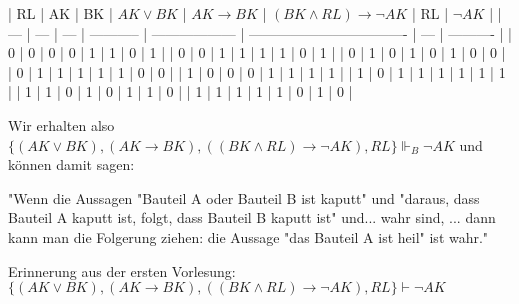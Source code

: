 \documentclass[a4paper]{article}
\begin{document}
\begin{multicols}{3}
  | RL  | AK  | BK  | $AK\vee BK$ | $AK\rightarrow BK$ | $(BK\wedge RL)\rightarrow\lnot AK$ | RL  | $\lnot AK$ |
  | --- | --- | --- | ----------- | ------------------ | ---------------------------------- | --- | ---------- |
  | 0   | 0   | 0   | 0           | 1                  | 1                                  | 0   | 1          |
  | 0   | 0   | 1   | 1           | 1                  | 1                                  | 0   | 1          |
  | 0   | 1   | 0   | 1           | 0                  | 1                                  | 0   | 0          |
  | 0   | 1   | 1   | 1           | 1                  | 1                                  | 0   | 0          |
  | 1   | 0   | 0   | 0           | 1                  | 1                                  | 1   | 1          |
  | 1   | 0   | 1   | 1           | 1                  | 1                                  | 1   | 1          |
  | 1   | 1   | 0   | 1           | 0                  | 1                                  | 1   | 0          |
  | 1   | 1   | 1   | 1           | 1                  | 0                                  | 1   | 0          |


  Wir erhalten also $\{(AK\vee BK),(AK\rightarrow BK), ((BK\wedge RL)\rightarrow \lnot AK),RL\} \Vdash_B \lnot AK$
  und können damit sagen:

  "Wenn die Aussagen "Bauteil A oder Bauteil B ist kaputt" und "daraus, dass Bauteil A kaputt ist, folgt, dass Bauteil B kaputt ist" und... wahr sind, ... dann kann man die Folgerung ziehen: die Aussage "das Bauteil A ist heil" ist wahr."

  Erinnerung aus der ersten Vorlesung: $\{(AK\vee BK),(AK\rightarrow BK), ((BK\wedge RL)\rightarrow \lnot AK),RL\} \vdash  \lnot AK$


\end{multicols}
\end{document}
